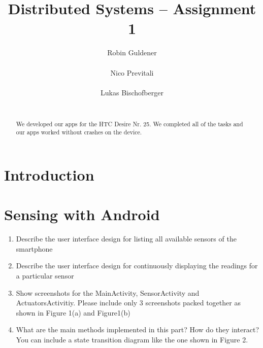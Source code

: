 \documentclass{report}
\title{Distributed Systems -- Assignment 1}
\author{
%
%
\alignauthor Robin Guldener\\
	\affaddr{ETH ID XX-XXX-XXX}\\
	\email{one@student.ethz.ch}
\alignauthor Nico Previtali\\
	\affaddr{ETH ID XX-XXX-XXX}\\
	\email{two@student.ethz.ch}
\alignauthor Lukas Bischofberger\\
	\affaddr{ETH ID 11-915-907}\\
	\email{lukasbi@student.ethz.ch}
}
\begin{document}
\maketitle

\begin{abstract}

We developed our apps for the HTC Desire Nr. 25. We completed all of the tasks and our apps worked without crashes on the device.
\end{abstract}

\section{Introduction}


\section{Sensing with Android}

\begin{enumerate}

  \item Describe the user interface design for listing all available sensors of the smartphone
  \item Describe the user interface design for continuously displaying the readings for a particular sensor
  \item Show screenshots for the MainActivity, SensorActivity and ActuatorsActivitiy. Please include only 3 screenshots packed together as shown in Figure 1(a) and Figure1(b)
  \item What are the main methods implemented in this part? How do they interact? You can include a state transition diagram like the one shown in Figure 2.
\end{enumerate}
\end{document}
